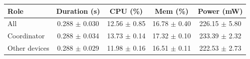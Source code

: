\begin{tabular}{lcccc}
\hline
\textbf{Role} & \textbf{Duration (s)} & \textbf{CPU (\%)} & \textbf{Mem (\%)} & \textbf{Power (mW)} \\
\hline
All & 0.288 $\pm$ 0.030 & 12.56 $\pm$ 0.85 & 16.78 $\pm$ 0.40 & 226.15 $\pm$ 5.80 \\
Coordinator & 0.288 $\pm$ 0.034 & 13.73 $\pm$ 0.14 & 17.32 $\pm$ 0.10 & 233.39 $\pm$ 2.32 \\
Other devices & 0.288 $\pm$ 0.029 & 11.98 $\pm$ 0.16 & 16.51 $\pm$ 0.11 & 222.53 $\pm$ 2.73 \\
\hline
\end{tabular}
